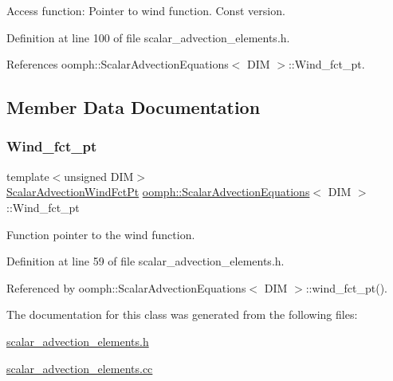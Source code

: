 Access function\+: Pointer to wind function. Const version. 



Definition at line 100 of file scalar\+\_\+advection\+\_\+elements.\+h.



References oomph\+::\+Scalar\+Advection\+Equations$<$ D\+I\+M $>$\+::\+Wind\+\_\+fct\+\_\+pt.



\subsection{Member Data Documentation}
\mbox{\label{classoomph_1_1ScalarAdvectionEquations_a6c98466fe7083d8d7542c35d23c918c1}} 
\subsubsection{\texorpdfstring{Wind\+\_\+fct\+\_\+pt}{Wind\_fct\_pt}}
{\footnotesize\ttfamily template$<$unsigned D\+IM$>$ \\
\hyperlink{classoomph_1_1ScalarAdvectionEquations_af80d315e76fe7392744d5442f1d2386d}{Scalar\+Advection\+Wind\+Fct\+Pt} \hyperlink{classoomph_1_1ScalarAdvectionEquations}{oomph\+::\+Scalar\+Advection\+Equations}$<$ D\+IM $>$\+::Wind\+\_\+fct\+\_\+pt\hspace{0.3cm}{\ttfamily [private]}}



Function pointer to the wind function. 



Definition at line 59 of file scalar\+\_\+advection\+\_\+elements.\+h.



Referenced by oomph\+::\+Scalar\+Advection\+Equations$<$ D\+I\+M $>$\+::wind\+\_\+fct\+\_\+pt().



The documentation for this class was generated from the following files\+:\begin{DoxyCompactItemize}
\item 
\hyperlink{scalar__advection__elements_8h}{scalar\+\_\+advection\+\_\+elements.\+h}\item 
\hyperlink{scalar__advection__elements_8cc}{scalar\+\_\+advection\+\_\+elements.\+cc}\end{DoxyCompactItemize}
